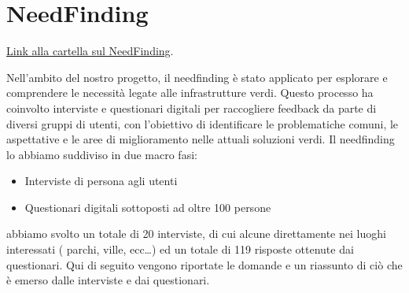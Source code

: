 \chapter{NeedFinding}
\href{https://drive.google.com/drive/u/0/folders/1XoItlFMNVkWT7CER1GdP-kYDjVKPnojq}{Link alla cartella sul NeedFinding}.

Nell'ambito del nostro progetto, il needfinding è stato applicato per esplorare e comprendere le necessità legate alle infrastrutture verdi. Questo processo ha coinvolto interviste e questionari digitali per raccogliere feedback da parte di diversi gruppi di utenti, con l'obiettivo di identificare le problematiche comuni, le aspettative e le aree di miglioramento nelle attuali soluzioni verdi.
Il needfinding lo abbiamo suddiviso in due macro fasi:
\begin{itemize}
    \item Interviste di persona agli utenti
    \item Questionari digitali sottoposti ad oltre 100 persone
\end{itemize}
abbiamo svolto un totale di 20 interviste, di cui alcune direttamente nei luoghi interessati ( parchi, ville, ecc…) ed un totale di 119 risposte ottenute dai questionari.
Qui di seguito vengono riportate le domande e un riassunto di ciò che è emerso dalle interviste e dai questionari.
